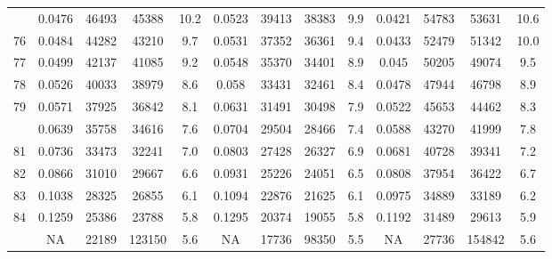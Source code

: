 \documentclass[
  14pt,
]{article}
\begin{document}
\begin{longtable}[t]{lcccccccccccc}
\addlinespace
75 & 0.0476 & 46493 & 45388 & 10.2 & 0.0523 & 39413 & 38383 & 9.9 & 0.0421 & 54783 & 53631 & 10.6\\
76 & 0.0484 & 44282 & 43210 & 9.7 & 0.0531 & 37352 & 36361 & 9.4 & 0.0433 & 52479 & 51342 & 10.0\\
77 & 0.0499 & 42137 & 41085 & 9.2 & 0.0548 & 35370 & 34401 & 8.9 & 0.045 & 50205 & 49074 & 9.5\\
78 & 0.0526 & 40033 & 38979 & 8.6 & 0.058 & 33431 & 32461 & 8.4 & 0.0478 & 47944 & 46798 & 8.9\\
79 & 0.0571 & 37925 & 36842 & 8.1 & 0.0631 & 31491 & 30498 & 7.9 & 0.0522 & 45653 & 44462 & 8.3\\
\addlinespace
80 & 0.0639 & 35758 & 34616 & 7.6 & 0.0704 & 29504 & 28466 & 7.4 & 0.0588 & 43270 & 41999 & 7.8\\
81 & 0.0736 & 33473 & 32241 & 7.0 & 0.0803 & 27428 & 26327 & 6.9 & 0.0681 & 40728 & 39341 & 7.2\\
82 & 0.0866 & 31010 & 29667 & 6.6 & 0.0931 & 25226 & 24051 & 6.5 & 0.0808 & 37954 & 36422 & 6.7\\
83 & 0.1038 & 28325 & 26855 & 6.1 & 0.1094 & 22876 & 21625 & 6.1 & 0.0975 & 34889 & 33189 & 6.2\\
84 & 0.1259 & 25386 & 23788 & 5.8 & 0.1295 & 20374 & 19055 & 5.8 & 0.1192 & 31489 & 29613 & 5.9\\
\addlinespace
85 & NA & 22189 & 123150 & 5.6 & NA & 17736 & 98350 & 5.5 & NA & 27736 & 154842 & 5.6\\*
\end{longtable}
\end{document}
